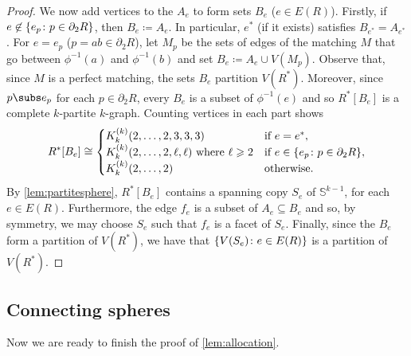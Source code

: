 \documentclass[12pt,reqno]{amsart}
\theoremstyle{plain}
\theoremstyle{definition}
\numberwithin{equation}{section}
\DeclarePairedDelimiter{\set}{\{}{\}}
\renewcommand{\geq}{\geqslant}
\renewcommand{\subset}{\subseteq}
\newcommand{\bS}{\mathbb{S}}
\begin{document}
\begin{proof}
		We now add vertices to the $A_e$ to form sets $B_e$ ($e \in E(R)$). Firstly, if $e \not\in \set{e_p \colon p \in \partial_2 R}$, then $B_e \coloneqq A_e$. In particular, $e^\ast$ (if it exists) satisfies $B_{e^\ast} = A_{e^\ast}$. For $e = e_p$ ($p = ab \in \partial_2 R$), let $M_p$ be the sets of edges of the matching $M$ that go between $\phi^{-1}(a)$ and $\phi^{-1}(b)$ and set $B_e \coloneqq A_e \cup V(M_p)$. Observe that, since $M$ is a perfect matching, the sets $B_e$ partition $V(R^\ast)$. Moreover, since $p \subs e_p$ for each $p \in \partial_2 R$, every $B_e$ is a subset of $\phi^{-1}(e)$ and so $R^\ast[B_e]$ is a complete $k$-partite $k$-graph. Counting vertices in each part shows
		\begin{equation*}
			R^\ast[B_e] \cong
			\begin{cases}
				K_k^{(k)}(2,  \dotsc, 2, 3, 3, 3)                               & \text{if } e = e^\ast,                                \\
				K_k^{(k)}(2,  \dotsc, 2, \ell, \ell) \text{ where } \ell \geq 2 & \text{if } e \in \set{e_p \colon p \in \partial_2 R}, \\
				K_k^{(k)}(2,  \dotsc, 2)                                        & \text{otherwise}.
			\end{cases}
		\end{equation*}
		By \cref{lem:partitesphere}, $R^\ast[B_e]$ contains a spanning copy $S_e$ of $\bS^{k - 1}$, for each $e \in E(R)$. Furthermore, the edge $f_e$ is a subset of $A_e \subset B_e$ and so, by symmetry, we may choose $S_e$ such that $f_e$ is a facet of $S_e$. Finally, since the $B_e$ form a partition of $V(R^\ast)$, we have that $\set{V(S_e) \colon e \in E(R)}$ is a partition of $V(R^\ast)$.
	\end{proof}
	
	
	\subsection{Connecting spheres}
	
	Now we are ready to finish the proof of \cref{lem:allocation}.
	
\end{document}
